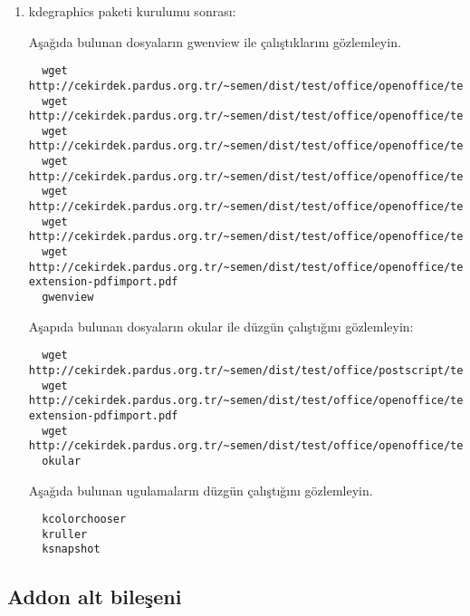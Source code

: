 \documentclass[a4paper,10pt]{article}
\begin{document}
\begin{enumerate}
\item kdegraphics paketi kurulumu sonrası:

Aşağıda bulunan dosyaların gwenview  ile çalıştıklarını gözlemleyin.  
\begin{verbatim} 
  wget http://cekirdek.pardus.org.tr/~semen/dist/test/office/openoffice/test_oodraw.jpg
  wget http://cekirdek.pardus.org.tr/~semen/dist/test/office/openoffice/test_oodraw.mng
  wget http://cekirdek.pardus.org.tr/~semen/dist/test/office/openoffice/test_oodraw.png
  wget http://cekirdek.pardus.org.tr/~semen/dist/test/office/openoffice/test_oodraw.ps
  wget http://cekirdek.pardus.org.tr/~semen/dist/test/office/openoffice/test_oodraw.tif
  wget http://cekirdek.pardus.org.tr/~semen/dist/test/office/openoffice/test_oodraw.xcf
  wget http://cekirdek.pardus.org.tr/~semen/dist/test/office/openoffice/test_openoffice-extension-pdfimport.pdf
  gwenview
\end{verbatim}
Aşapıda bulunan dosyaların okular ile düzgün çalıştığını gözlemleyin:
\begin{verbatim} 
  wget http://cekirdek.pardus.org.tr/~semen/dist/test/office/postscript/test_ghostscript.dvi
  wget http://cekirdek.pardus.org.tr/~semen/dist/test/office/openoffice/test_openoffice-extension-pdfimport.pdf
  wget http://cekirdek.pardus.org.tr/~semen/dist/test/office/openoffice/test_oodraw.ps
  okular
 \end{verbatim}

Aşağıda bulunan ugulamaların düzgün çalıştığını gözlemleyin.
\begin{verbatim}
  kcolorchooser
  kruller
  ksnapshot
\end{verbatim}


\end{enumerate}

\subsection*{Addon alt bileşeni}
\end{document}
